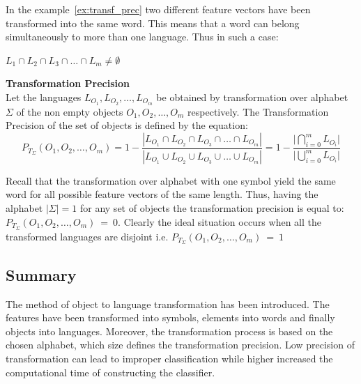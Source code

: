 \documentclass{mini}
\newcommand{\transformationPrecision}[2]{
    P_{T_{#1}}(#2)
}
\begin{document}
In the example~\ref{ex:transf_prec} two different feature vectors have been transformed into the same word. This means that a word can belong simultaneously to more than one language. Thus in such a case:
\begin{center}
    $L_{1} \cap L_{2} \cap L_{3} \cap \ldots \cap L_{m} \neq \emptyset$
\end{center}


\begin{definition} {\bf Transformation Precision}\\
    Let the languages $L_{O_1},L_{O_2},\ldots,L_{O_m}$ be obtained by transformation over alphabet $\Sigma$ of the non empty objects $O_{1},O_{2},\ldots,O_{m}$ respectively.
    The Transformation Precision of the set of objects is defined by the equation:
       \begin{equation}
       \transformationPrecision{\Sigma}{O_{1},O_{2},\ldots,O_{m}}
           =
            1 - \frac   {| L_{O_1} \cap L_{O_2} \cap L_{O_3} \cap \ldots \cap L_{O_m} |}
                    {| L_{O_1} \cup L_{O_2} \cup L_{O_3} \cup \ldots \cup L_{O_m} |}
               =
            1 - \frac   {\Big| \bigcap\limits_{i=0}^{m} L_{O_i} \Big|}
                    {\Big| \bigcup\limits_{i=0}^{m} L_{O_i} \Big|}
       \end{equation}
\end{definition}

Recall that the transformation over alphabet with one symbol yield the same word for all possible feature vectors of the same length. Thus, having the alphabet $|\Sigma|=1$ for any set of objects the transformation precision is equal to: $\transformationPrecision{\Sigma}{O_{1},O_{2},\ldots,O_{m}}~=~0$. Clearly the ideal situation occurs when all the transformed languages are disjoint i.e. $\transformationPrecision{\Sigma}{O_{1},O_{2},\ldots,O_{m}}~=~1$

\subsection{Summary}\label{sec:lan_theory_transf_summary}
The method of object to language transformation has been introduced. The features have been transformed into symbols, elements into words and finally objects into languages. Moreover, the transformation process is based on the chosen alphabet, which size defines the transformation precision. Low precision of transformation can lead to improper classification while higher increased the computational time of constructing the classifier.
\end{document}
